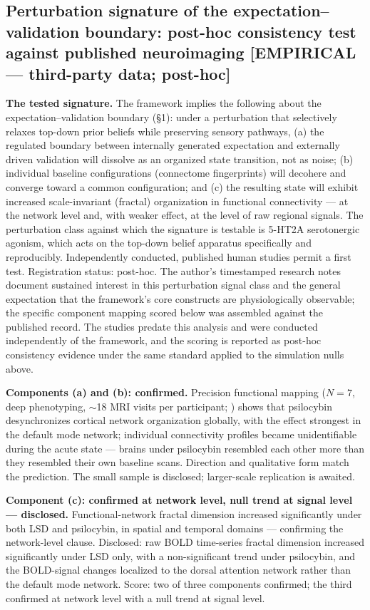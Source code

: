 \documentclass[11pt,twocolumn]{article}
\theoremstyle{plain}
\begin{document}
\FloatBarrier
\subsection{Perturbation signature of the expectation--validation boundary: post-hoc consistency test against published neuroimaging [EMPIRICAL --- third-party data; post-hoc]}
\label{sec:pbnd}

\textbf{The tested signature.} The framework implies the following about the expectation--validation boundary (\S{}1): under a perturbation that selectively relaxes top-down prior beliefs while preserving sensory pathways, (a) the regulated boundary between internally generated expectation and externally driven validation will dissolve as an organized state transition, not as noise; (b) individual baseline configurations (connectome fingerprints) will decohere and converge toward a common configuration; and (c) the resulting state will exhibit increased scale-invariant (fractal) organization in functional connectivity --- at the network level and, with weaker effect, at the level of raw regional signals. The perturbation class against which the signature is testable is 5-HT2A serotonergic agonism, which acts on the top-down belief apparatus specifically and reproducibly. Independently conducted, published human studies permit a first test. Registration status: post-hoc. The author's timestamped research notes document sustained interest in this perturbation signal class and the general expectation that the framework's core constructs are physiologically observable; the specific component mapping scored below was assembled against the published record. The studies predate this analysis and were conducted independently of the framework, and the scoring is reported as post-hoc consistency evidence under the same standard applied to the simulation nulls above.

\textbf{Components (a) and (b): confirmed.} Precision functional mapping ($N = 7$, deep phenotyping, $\sim$18 MRI visits per participant; \citealp{siegel2024}) shows that psilocybin desynchronizes cortical network organization globally, with the effect strongest in the default mode network; individual connectivity profiles became unidentifiable during the acute state --- brains under psilocybin resembled each other more than they resembled their own baseline scans. Direction and qualitative form match the prediction. The small sample is disclosed; larger-scale replication is awaited.

\textbf{Component (c): confirmed at network level, null trend at signal level --- disclosed.} Functional-network fractal dimension increased significantly under both LSD and psilocybin, in spatial and temporal domains \citep{varley2020} --- confirming the network-level clause. Disclosed: raw BOLD time-series fractal dimension increased significantly under LSD only, with a non-significant trend under psilocybin, and the BOLD-signal changes localized to the dorsal attention network rather than the default mode network. Score: two of three components confirmed; the third confirmed at network level with a null trend at signal level.
\end{document}
